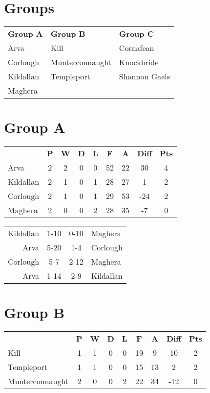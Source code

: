 \documentclass[11pt,a4paper]{article}
\begin{document}
\section*{Groups}

\begin{tabular}{lll}
\textbf{Group A} & \textbf{Group B} & \textbf{Group C} \\
Arva & Kill & Cornafean \\
Corlough & Munterconnaught & Knockbride \\
Kildallan & Templeport & Shannon Gaels \\
Maghera & & \\
\end{tabular}

\section*{Group A}

\begin{tabular}{lcccccccc}
 & \textbf{P} & \textbf{W} & \textbf{D} & \textbf{L} & \textbf{F} & \textbf{A} & \textbf{Diff} & \textbf{Pts} \\
Arva & 2 & 2 & 0 & 0 & 52 & 22 & 30 & 4 \\
Kildallan & 2 & 1 & 0 & 1 & 28 & 27 & 1 & 2 \\
Corlough & 2 & 1 & 0 & 1 & 29 & 53 & -24 & 2 \\
Maghera & 2 & 0 & 0 & 2 & 28 & 35 & -7 & 0\\
\end{tabular}

\vspace{10 mm}

\begin{tabular}{rccl}
Kildallan & 1-10 & 0-10 & Maghera \\
Arva & 5-20 & 1-4 & Corlough \\
Corlough & 5-7 & 2-12 & Maghera \\
Arva & 1-14 & 2-9 & Kildallan
\end{tabular}

\section*{Group B}

\begin{tabular}{lcccccccc}
 & \textbf{P} & \textbf{W} & \textbf{D} & \textbf{L} & \textbf{F} & \textbf{A} & \textbf{Diff} & \textbf{Pts} \\
Kill & 1 & 1 & 0 & 0 & 19 & 9 & 10 & 2 \\
Templeport & 1 & 1 & 0 & 0 & 15 & 13 & 2 & 2 \\
Munterconnaught & 2 & 0 & 0 & 2 & 22 & 34 & -12 & 0 \\
\end{tabular}
\end{document}
